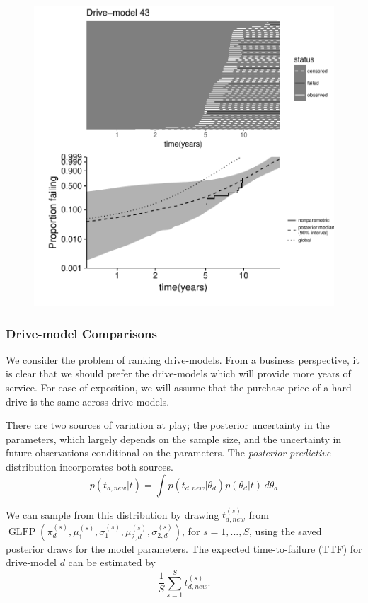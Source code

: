 \documentclass[12pt]{article}
\begin{document}
\begin{figure}
\centering
\includegraphics{dm43-shrinkage}
\caption{}
\label{fig:ex-mod-43}
\end{figure}

\subsubsection{Drive-model Comparisons}
\label{subsubsec:Drive-model Comparisons}
We consider the problem of ranking drive-models. From a
business perspective, it is clear
that we should prefer the drive-models which will provide more years
of service. For ease of exposition, we will assume that the purchase
price of a hard-drive is the same across drive-models.

There are two sources of variation at play; the
posterior uncertainty in the parameters, which largely depends on the
sample size, and the uncertainty in future
observations conditional on the parameters. The {\em posterior
  predictive} distribution incorporates both sources.
\begin{equation*}
  p(t_{d,new}|t) = \int p(t_{d,new}|\theta_d) p(\theta_d|t) \, d\theta_d
\end{equation*}

We can sample from this distribution by drawing $t_{d,new}^{(s)}$ from
$\operatorname{GLFP}(\pi_d^{(s)},
\mu_1^{(s)},\sigma_1^{(s)},\mu_{2,d}^{(s)},\sigma_{2,d}^{(s)})$, for
$s=1,...,S$, using the saved posterior draws for the model
parameters. The expected time-to-failure (TTF) for drive-model $d$ can be estimated by
$$\frac{1}{S} \sum_{s=1}^{S} t_{d,new}^{(s)}.$$
\end{document}

